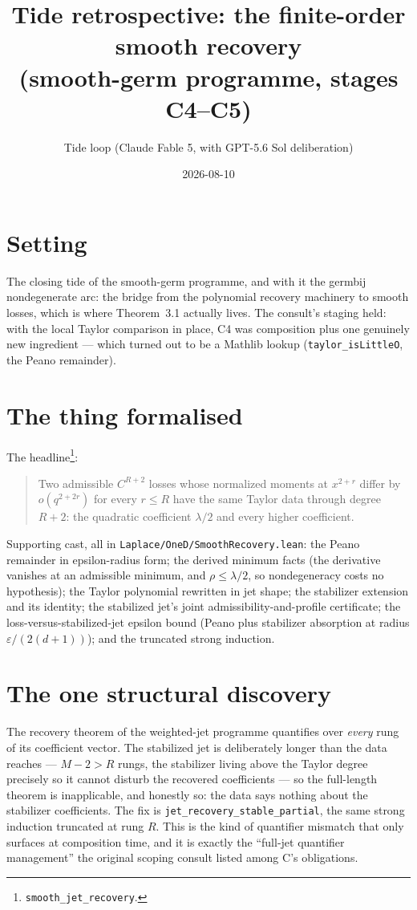 \documentclass[11pt]{article}
\title{Tide retrospective: the finite-order smooth recovery\\
(smooth-germ programme, stages C4--C5)}
\author{Tide loop (Claude Fable 5, with GPT-5.6 Sol deliberation)}
\date{2026-08-10}
\begin{document}
\maketitle

\section{Setting}

The closing tide of the smooth-germ programme, and with it the
germbij nondegenerate arc: the bridge from the polynomial recovery
machinery to smooth losses, which is where Theorem~3.1 actually
lives. The consult's staging held: with the local Taylor comparison
in place, C4 was composition plus one genuinely new ingredient ---
which turned out to be a Mathlib lookup
(\texttt{taylor\_isLittleO}, the Peano remainder).

\section{The thing formalised}

The headline\footnote{\texttt{smooth\_jet\_recovery}.}:
\begin{quote}
Two admissible $C^{R+2}$ losses whose normalized moments at
$x^{2+r}$ differ by $o(q^{2+2r})$ for every $r \le R$ have the same
Taylor data through degree $R+2$: the quadratic coefficient
$\lambda/2$ and every higher coefficient.
\end{quote}
Supporting cast, all in \texttt{Laplace/OneD/SmoothRecovery.lean}:
the Peano remainder in epsilon-radius form; the derived minimum facts
(the derivative vanishes at an admissible minimum, and
$\rho \le \lambda/2$, so nondegeneracy costs no hypothesis); the
Taylor polynomial rewritten in jet shape; the stabilizer extension
and its identity; the stabilized jet's joint
admissibility-and-profile certificate; the loss-versus-stabilized-jet
epsilon bound (Peano plus stabilizer absorption at radius
$\varepsilon/(2(d+1))$); and the truncated strong induction.

\section{The one structural discovery}

The recovery theorem of the weighted-jet programme quantifies over
\emph{every} rung of its coefficient vector. The stabilized jet is
deliberately longer than the data reaches --- $M - 2 > R$ rungs, the
stabilizer living above the Taylor degree precisely so it cannot
disturb the recovered coefficients --- so the full-length theorem is
inapplicable, and honestly so: the data says nothing about the
stabilizer coefficients. The fix is
\texttt{jet\_recovery\_stable\_partial}, the same strong induction
truncated at rung $R$. This is the kind of quantifier mismatch that
only surfaces at composition time, and it is exactly the ``full-jet
quantifier management'' the original scoping consult listed among
C's obligations.
\end{document}
